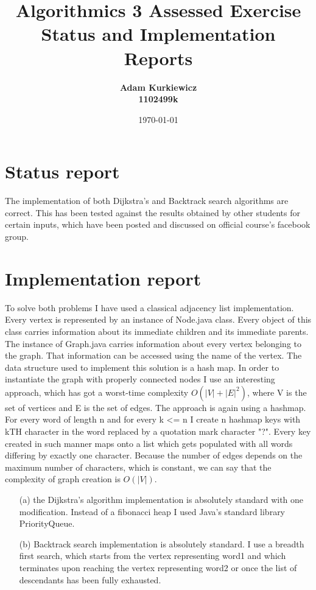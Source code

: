\documentclass{article}
\title{Algorithmics 3 Assessed Exercise\\ \vspace{4mm} 
Status and Implementation Reports}
\author{\bf Adam Kurkiewicz\\ \bf 1102499k}
\date{\today}
\begin{document}
\maketitle

\section*{Status report}

The implementation of both Dijkstra's and Backtrack search algorithms are correct. This has been tested against the results obtained by other students for certain inputs, which have been posted and discussed on official course's facebook group.

\section*{Implementation report}

To solve both problems I have used a classical adjacency list implementation. Every vertex is represented by an instance of Node.java class. Every object of this class carries information about its immediate children and its immediate parents. The instance of Graph.java carries information about every vertex belonging to the graph. That information can be accessed using the name of the vertex. The data structure used to implement this solution is a hash map. In order to instantiate the graph with properly connected nodes I use an interesting approach, which has got a worst-time complexity $O(\left\vert{V}\right\vert + \left\vert{E}\right\vert^2)$, where V is the set of vertices and E is the set of edges. The approach is again using a hashmap. For every word of length n and for every k <= n I create n hashmap keys with k\uppercase{th} character in the word replaced by a quotation mark character "?". Every key created in such manner maps onto a list which gets populated with all words differing by exactly one character. Because the number of edges depends on the maximum number of characters, which is constant, we can say that the complexity of graph creation is $O(\left\vert{V}\right\vert)$. 

\begin{itemize}
\item[(a)] 
the Dijkstra's algorithm implementation is absolutely standard with one modification. Instead of a fibonacci heap I used Java's standard library PriorityQueue.
\item[(b)]
Backtrack search implementation is absolutely standard. I use a breadth first search, which starts from the vertex representing word1 and which terminates upon reaching the vertex representing word2 or once the list of descendants has been fully exhausted.
\end{itemize}
\end{document}

